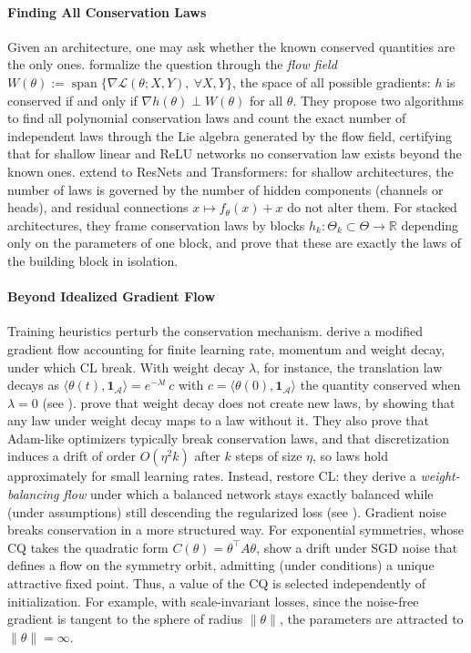 \documentclass[mathematics,review,submit,moreauthors]{Definitions/mdpi}
\begin{document}
\paragraph{Finding All Conservation Laws}
Given an architecture, one may ask whether the known conserved quantities are the only ones.
\citet{marcotte2023} formalize the question through the \emph{flow field} $W(\theta):=\operatorname{span}\{\nabla\mathcal{L}(\theta;X,Y),\ \forall X,Y\}$, the space of all possible gradients: $h$ is conserved if and only if $\nabla h(\theta)\perp W(\theta)$ for all $\theta$.
They propose two algorithms to find all polynomial conservation laws and count the exact number of independent laws through the Lie algebra generated by the flow field, certifying that for shallow linear and ReLU networks no conservation law exists beyond the known ones.
\citet{marcotte2025p4icml} extend to ResNets and Transformers: for shallow architectures, the number of laws is governed by the number of hidden components (channels or heads), and residual connections $x\mapsto f_\theta(x)+x$ do not alter them.
For stacked architectures, they frame conservation laws by blocks $h_k:\Theta_k\subset\Theta\to\mathbb{R}$ depending only on the parameters of one block, and prove that these are exactly the laws of the building block in isolation.

\paragraph{Beyond Idealized Gradient Flow}
Training heuristics perturb the conservation mechanism.
\citet{kunin2020} derive a modified gradient flow accounting for finite learning rate, momentum and weight decay, under which CL break.
With weight decay $\lambda$, for instance, the translation law decays as $\langle\theta(t),\boldsymbol{1}_{\mathcal{A}}\rangle=e^{-\lambda t}\,c$ with $c=\langle\theta(0),\boldsymbol{1}_{\mathcal{A}}\rangle$ the quantity conserved when $\lambda=0$ (see ).
\citet{marcotte2025p4icml} prove that weight decay does not create new laws, by showing that any law under weight decay maps to a law without it.
They also prove that Adam-like optimizers typically break conservation laws, and that discretization induces a drift of order $O(\eta^2 k)$ after $k$ steps of size $\eta$, so laws hold approximately for small learning rates.
Instead, \citet{saul2023} restore CL: they derive a \emph{weight-balancing flow} under which a balanced network stays exactly balanced while (under assumptions) still descending the regularized loss (see ).
Gradient noise breaks conservation in a more structured way.
For exponential symmetries, whose CQ takes the quadratic form $C(\theta)=\theta^\top A\theta$, \citet{ziyin2024a} show a drift under SGD noise that defines a flow on the symmetry orbit, admitting (under conditions) a unique attractive fixed point.
Thus, a value of the CQ is selected independently of initialization.
For example, with scale-invariant losses, since the noise-free gradient is tangent to the sphere of radius $\lVert\theta\rVert$, the parameters are attracted to $\lVert\theta\rVert=\infty$.
\end{document}
